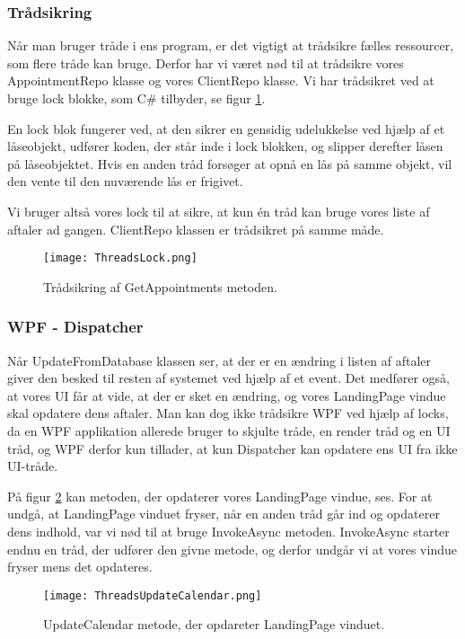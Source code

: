 \subsubsection{Trådsikring}
Når man bruger tråde i ens program, er det vigtigt at trådsikre fælles ressourcer, som flere tråde kan bruge.
Derfor har vi været nød til at trådsikre vores AppointmentRepo klasse og vores ClientRepo klasse.
Vi har trådsikret ved at bruge lock blokke, som C\# tilbyder, se figur \ref{fig:threadsLock}.

En lock blok fungerer ved, at den sikrer en gensidig udelukkelse ved hjælp af et låseobjekt, udfører koden, der står inde i lock blokken, og slipper derefter låsen på låseobjektet.
Hvis en anden tråd forsøger at opnå en lås på samme objekt, vil den vente til den nuværende lås er frigivet.

Vi bruger altså vores lock til at sikre, at kun én tråd kan bruge vores liste af aftaler ad gangen.
ClientRepo klassen er trådsikret på samme måde.

\begin{figure}[h]
    \caption{Trådsikring af GetAppointments metoden.}
    \centering
        \texttt{[image: ThreadsLock.png]}
    \label{fig:threadsLock}
\end{figure}

\subsubsection{WPF - Dispatcher}

Når UpdateFromDatabase klassen ser, at der er en ændring i listen af aftaler giver den besked til resten af systemet ved hjælp af et event.
Det medfører også, at vores UI får at vide, at der er sket en ændring, og vores LandingPage vindue skal opdatere dens aftaler.
Man kan dog ikke trådsikre WPF ved hjælp af locks, da en WPF applikation allerede bruger to skjulte tråde, en render tråd og en UI tråd, og WPF derfor kun tillader, at kun Dispatcher kan opdatere ens UI fra ikke UI-tråde.\cite{wpfdispatcher}

På figur \ref{fig:threadsWPF} kan metoden, der opdaterer vores LandingPage vindue, ses.
For at undgå, at LandingPage vinduet fryser, når en anden tråd går ind og opdaterer dens indhold, var vi nød til at bruge InvokeAsync metoden.
InvokeAsync starter endnu en tråd, der udfører den givne metode, og derfor undgår vi at vores vindue fryser mens det opdateres.

\begin{figure}[H]
    \caption{UpdateCalendar metode, der opdareter LandingPage vinduet.}
    \centering
        \texttt{[image: ThreadsUpdateCalendar.png]}
    \label{fig:threadsWPF}
\end{figure}

